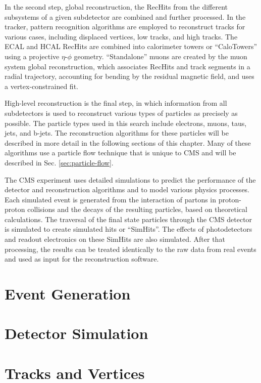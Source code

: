 In the second step, global reconstruction, the RecHits from the different subsystems of a given subdetector are combined and further processed. In the tracker, pattern recognition algorithms are employed to reconstruct tracks for various cases, including displaced vertices, low \pt tracks, and high \pt tracks. The ECAL and HCAL RecHits are combined into calorimeter towers or ``CaloTowers'' using a projective $\eta$-$\phi$ geometry. ``Standalone'' muons are created by the muon system global reconstruction, which associates RecHits and track segments in a radial trajectory, accounting for bending by the residual magnetic field, and uses a vertex-constrained fit.

High-level reconstruction is the final step, in which information from all subdetectors is used to reconstruct various types of particles as precisely as possible. The particle types used in this search include electrons, muons, taus, jets, and b-jets. The reconstruction algorithms for these particles will be described in more detail in the following sections of this chapter. Many of these algorithms use a particle flow technique that is unique to CMS and will be described in Sec. \ref{sec:particle-flow}.

The CMS experiment uses detailed simulations to predict the performance of the detector and reconstruction algorithms and to model various physics processes. Each simulated event is generated from the interaction of partons in proton-proton collisions and the decays of the resulting particles, based on theoretical calculations. The traversal of the final state particles through the CMS detector is simulated to create simulated hits or ``SimHits''. The effects of photodetectors and readout electronics on these SimHits are also simulated. After that processing, the results can be treated identically to the raw data from real events and used as input for the reconstruction software.

\section{Event Generation}

\section{Detector Simulation}

\section{Tracks and Vertices
\label{sec:tracks}}

